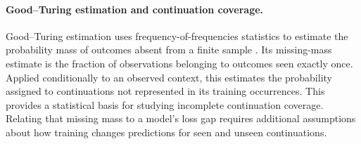 \paragraph{Good--Turing estimation and continuation coverage.}
Good--Turing estimation uses frequency-of-frequencies statistics to estimate the probability mass of outcomes absent from a finite sample \citep{good1953population,gale1995good}. Its missing-mass estimate is the fraction of observations belonging to outcomes seen exactly once. Applied conditionally to an observed context, this estimates the probability assigned to continuations not represented in its training occurrences. This provides a statistical basis for studying incomplete continuation coverage. Relating that missing mass to a model's loss gap requires additional assumptions about how training changes predictions for seen and unseen continuations.
